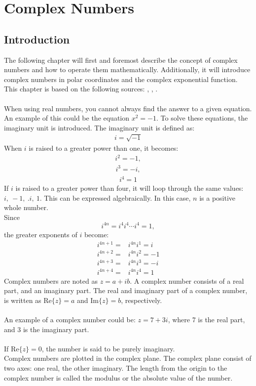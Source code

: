 \chapter{Complex Numbers}

\section{Introduction}
The following chapter will first and foremost describe the concept of complex numbers and how to operate them mathematically. Additionally, it will introduce complex numbers in polar coordinates and the complex exponential function.
\\
This chapter is based on the following sources: \cite{complexpaul}, \cite{complexpurple}, \cite{complexnotebook}.
\\
\\
When using real numbers, you cannot always find the answer to a given equation. An example of this could be the equation $x^2=-1$. To solve these equations, the imaginary unit is introduced. The imaginary unit is defined as:
\begin{align*}
i=\sqrt{-1}
\end{align*}
When $i$ is raised to a greater power than one, it becomes:
\begin{align*}
i^2=-1,
\end{align*}
\begin{align*}
i^3=-i,
\end{align*}
\begin{align*}
i^4=1
\end{align*}
If $i$ is raised to a greater power than four, it will loop through the same values: $i, \ -1, \ .i, \ 1$. This can be expressed algebraically. In this case, $n$ is a  positive whole number. 
\\
Since $$i^{4n} = i^4i^4\cdots i^4 = 1,$$
the greater exponents of $i$ become:
\begin{align*}
	i^{4n+1} =& i^{4n}i^1 = i \\
	i^{4n+2} =& i^{4n}i^2 = -1 \\
	i^{4n+3} =& i^{4n}i^3 = -i \\
	i^{4n+4} =& i^{4n}i^4 = 1
\end{align*}
Complex numbers are noted as $z = a+ib$. A complex number consists of a real part, and an imaginary part. The real and imaginary part of a complex number, is written as $\text{Re}\{z\}=a$ and $\text{Im}\{z\}=b$, respectively.
\\
\\
An example of a complex number could be: $z=7+3i$, where 7 is the real part, and 3 is the imaginary part. 
\\
\\
If $\text{Re}\{z\}=0$, the number is said to be purely imaginary.  
\\
Complex numbers are plotted in the complex plane. The complex plane consist of two axes: one real, the other imaginary.
The length from the origin to the complex number is called the modulus or the absolute value of the number.

